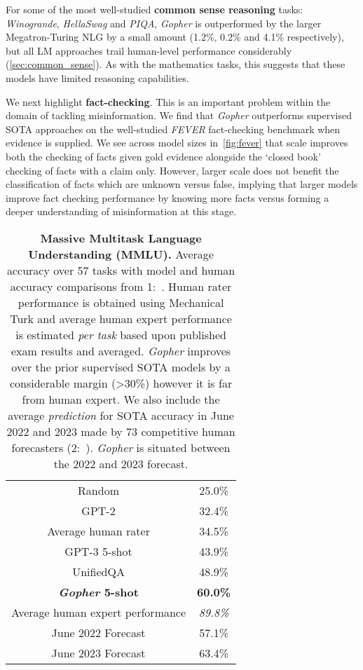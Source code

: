 \documentclass[11pt, a4paper, logo, internal, copyright, nonumbering]{deepmind}
\newcommand{\gopher}{\textit{Gopher}\xspace}
\begin{document}
For some of the most well-studied \textbf{common sense reasoning} tasks: \textit{Winogrande}, \textit{HellaSwag} and \textit{PIQA}, \gopher is outperformed by the larger Megatron-Turing NLG by a small amount (1.2\%, 0.2\% and 4.1\% respectively), but all LM approaches trail human-level performance considerably (\autoref{sec:common_sense}).  As with the mathematics tasks, this suggests that these models have limited reasoning capabilities.


We next highlight \textbf{fact-checking}. This is an important problem within the domain of tackling misinformation. We find that \gopher outperforms supervised SOTA approaches on the well-studied \textit{FEVER} fact-checking benchmark when evidence is supplied. We see across model sizes in~\autoref{fig:fever} that scale improves both the checking of facts given gold evidence alongside the `closed book' checking of facts with a claim only. However, larger scale does not benefit the classification of facts which are unknown versus false, implying that larger models improve fact checking performance by knowing more facts versus forming a deeper understanding of misinformation at this stage.


\begin{table}[t]
    \centering
    \begin{tabular}{cc}
    \toprule
        Random & 25.0\% \\
        GPT-2 &  32.4\% \\
        Average human rater & 34.5\% \\
        GPT-3 5-shot & 43.9\% \\
        UnifiedQA   & 48.9\% \\ 
        \textbf{\gopher 5-shot} & \textbf{60.0\%} \\
        Average human expert performance & \textit{89.8\%} \\
        \midrule
        June 2022 Forecast& 57.1\% \\
        June 2023 Forecast& 63.4\% \\
         \bottomrule
    \end{tabular}
    \caption{\textbf{Massive Multitask Language Understanding (MMLU).} Average accuracy over 57 tasks with model and human accuracy comparisons from 1:~\citet{hendrycks2020measuring}. Human rater performance is obtained using Mechanical Turk and average human expert performance is estimated \textit{per task} based upon published exam results and averaged. \gopher improves over the prior supervised SOTA models by a considerable margin (>30\%) however it is far from human expert. We also include the average \textit{prediction} for SOTA accuracy in June 2022 and 2023 made by 73 competitive human forecasters (2:~\citet{forecast_blog}). \gopher is situated between the 2022 and 2023 forecast.}
    \label{tab:mmlu}
\end{table}
\end{document}
